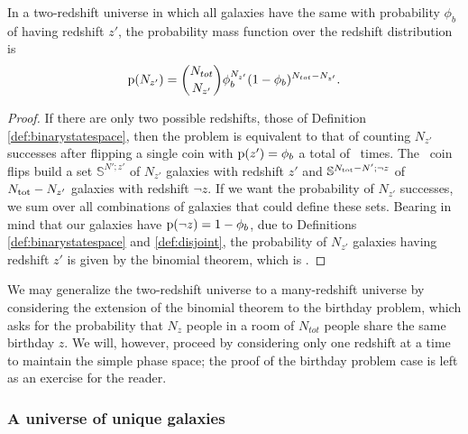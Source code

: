 \begin{theorem}
	In a two-redshift universe in which all galaxies have the same \pzpdf with probability $\phi_{b}$ of having redshift $z'$, the probability mass function over the redshift distribution is
	\begin{equation}
	\eqlabel{eqn:binomial}
	\pr{N_{z'}} = \binom{N_{tot}}{N_{z'}} \phi_{b}^{N_{z'}} (1 - \phi_{b})^{N_{tot} - N_{z'}} .
	\end{equation}
\end{theorem}

\begin{proof}
If there are only two possible redshifts, those of Definition \ref{def:binarystatespace}, then the problem is equivalent to that of counting $N_{z'}$ successes after flipping a single coin with $\mathrm{p}(z') = \phi_{b}$ a total of \ntot\ times.
The \ntot\ coin flips build a set $\mathbb{S}^{N'; z'}$ of $N_{z'}$ galaxies with redshift $z'$ and $\mathbb{S}^{N_{\mathrm{tot}} - N'; \lnot z}$ of $N_{\mathrm{tot}} - N_{z'}$ galaxies with redshift $\lnot z$.
If we want the probability of $N_{z'}$ successes, we sum over all combinations of galaxies that could define these sets.
Bearing in mind that our galaxies have $\mathrm{p}(\lnot z) = 1 - \phi_{b}$, due to Definitions \ref{def:binarystatespace} and \ref{def:disjoint}, the probability of $N_{z'}$ galaxies having redshift $z'$ is given by the binomial theorem, which is .
\end{proof}

We may generalize the two-redshift universe to a many-redshift universe by considering the extension of the binomial theorem to the birthday problem, which asks for the probability that $N_{z}$ people in a room of $N_{tot}$ people share the same birthday $z$.
We will, however, proceed by considering only one redshift at a time to maintain the simple phase space; the proof of the birthday problem case is left as an exercise for the reader.

\subsubsection{A universe of unique galaxies}

